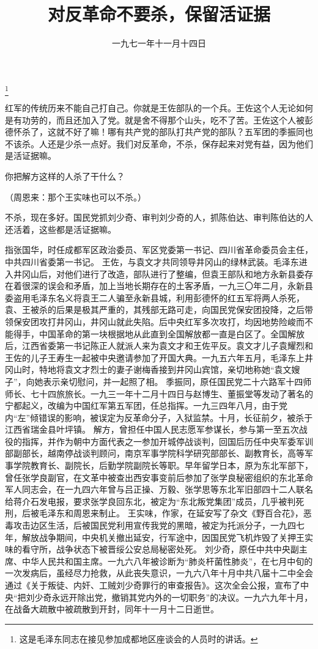
\title{对反革命不要杀，保留活证据}
\date{一九七一年十一月十四日}
\thanks{这是毛泽东同志在接见参加成都地区座谈会的人员时的讲话。}
\maketitle


红军的传统历来不能自己打自己。你就是王佐部队的一个兵。王佐这个人无论如何是有功劳的，而且还加入了党。就是舍不得那个山头，吃不了苦。王佐这个人被彭德怀杀了，这就不好了嘛！哪有共产党的部队打共产党的部队？五军团的季振同也不该杀。人还是少杀一点好。我们对反革命，不杀，保存起来对党有益，因为他们是活证据嘛。

你把解方这样的人杀了干什么？

（周恩来：那个王实味也可以不杀。）

不杀，现在多好。国民党抓刘少奇、审判刘少奇的人，抓陈伯达、审判陈伯达的人还活着，这些都是活证据嘛。

\begin{maonote}
指张国华，时任成都军区政治委员、军区党委第一书记、四川省革命委员会主任，中共四川省委第一书记。
王佐，与袁文才共同领导井冈山的绿林武装。毛泽东进入井冈山后，对他们进行了改造，部队进行了整编，但袁王部队和地方永新县委存在着很深的误会和矛盾，加上当地长期存在的土客矛盾，一九三〇年二月，永新县委盗用毛泽东名义将袁王二人骗至永新县城，利用彭德怀的红五军将两人杀死，袁、王被杀的后果是极其严重的，其残部无路可走，向国民党保安团投降，之后带领保安团攻打井冈山，井冈山就此失陷。后中央红军多次攻打，均因地势险峻而不能得手，中国革命的第一块根据地从此直到全国解放都一直是白区了。全国解放后，江西省委第一书记陈正人就派人来为袁文才和王佐平反。袁文才儿子袁耀烈和王佐的儿子王寿生一起被中央邀请参加了开国大典。一九五六年五月，毛泽东上井冈山时，特地将袁文才烈士的妻子谢梅香接到井冈山宾馆，亲切地称她“袁文嫂子”，向她表示亲切慰问，并一起照了相。
季振同，原任国民党二十六路军十四师师长、七十四旅旅长。一九三一年十二月十四日与赵博生、董振堂等发动了著名的宁都起义，改编为中国红军第五军团，任总指挥。一九三四年八月，由于党内“左”倾错误的影响，被误定为反革命分子，入狱监禁。十月，长征前夕，被杀于江西省瑞金县叶坪镇。
解方，曾担任中国人民志愿军参谋长，参与第一至五次战役的指挥，并作为朝中方面代表之一参加开城停战谈判，回国后历任中央军委军训部副部长，越南停战谈判顾问，南京军事学院科学研究部部长、副教育长，高等军事学院教育长、副院长，后勤学院副院长等职。早年留学日本，原为东北军部下，曾任张学良副官，在文革中被查出西安事变前后参加了张学良秘密组织的东北革命军人同志会，在一九四六年曾与吕正操、万毅、张学思等东北军旧部四十二人联名给蒋介石发电报，要求张学良回东北，被定为“东北叛党集团”成员，几乎被判死刑，后被毛泽东和周恩来制止。
王实味，作家，在延安写了杂文《野百合花》，恶毒攻击边区生活，后被国民党利用宣传我党的黑暗，被定为托派分子，一九四七年，解放战争期间，中央机关撤出延安，行军途中，因国民党飞机炸毁了关押王实味的看守所，战争状态下被晋绥公安总局秘密处死。
刘少奇，原任中共中央副主席、中华人民共和国主席。一九六八年被诊断为“肺炎杆菌性肺炎”，在七月中旬的一次发病后，虽经尽力抢救，从此丧失意识，一九六八年十月中共八届十二中全会通过《关于叛徒、内奸、工贼刘少奇罪行的审查报告》。这次全会公报，宣布了中央“把刘少奇永远开除出党，撤销其党内外的一切职务”的决议。一九六九年十月，在战备大疏散中被疏散到开封，同年十一月十二日逝世。
\end{maonote}
